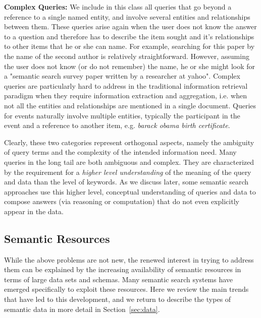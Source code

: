	\textbf{Complex Queries:} We include in this class all queries that go beyond a reference to a single named entity, and involve several entities and relationships between them. These queries arise again when the user does not know the answer to a question and therefore has to describe the item sought and it's relationships to other items that he or she can name. For example, searching for this paper by the name of the second author is relatively straightforward. However, assuming the user does not know (or do not remember) the name, he or she might look for a "semantic search survey paper written by a researcher at yahoo". Complex queries are particularly hard to address in the traditional information retrieval paradigm when they require information extraction and aggregation, i.e. when not all the entities and relationships are mentioned in a single document. Queries for events naturally involve multiple entities, typically the participant in the event and a reference to another item, e.g. \emph{barack obama birth certificate}. 

Clearly, these two categories represent orthogonal aspects, namely the ambiguity of query terms and the complexity of the intended information need. Many queries in the long tail are both ambiguous and complex. They are characterized by the requirement for a \emph{higher level understanding} of the meaning of the query and data than the level of keywords. As we discuss later, some semantic search approaches use this higher level, conceptual understanding of queries and data to compose answers (via reasoning or computation) that do not even explicitly appear in the data. 

\subsection{Semantic Resources}

While the above problems are not new, the renewed interest in trying to address them can be explained by the increasing availability of semantic resources in terms of large data sets and schemas. Many semantic search systems have emerged specifically to exploit these resources. Here we review the main trends that have led to this development, and we return to describe the types of semantic data in more detail in Section~\ref{sec:data}. 

